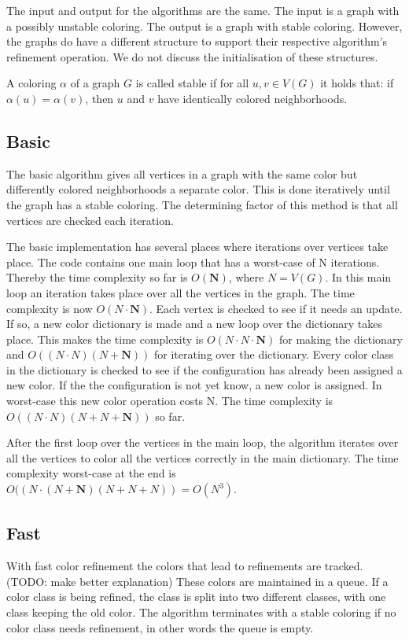 \documentclass[twoside]{article}
\begin{document}
\begin{multicols}{2}
The input and output for the algorithms are the same. The input is a graph with a possibly unstable  coloring. The output is a graph with stable coloring. However, the graphs do have a different structure to support their respective algorithm's refinement operation. We do not discuss the initialisation of these structures.

A coloring $\alpha$ of a graph $G$ is called stable if for all $u, v \in V(G)$ it holds that: if $\alpha(u) = \alpha(v)$, then $u$ and $v$ have identically colored neighborhoods.
 

\subsection{Basic}
The basic algorithm gives all vertices in a graph with the same color but differently colored neighborhoods a separate color. This is done iteratively until the graph has a stable coloring. The determining factor of this method is that all vertices are checked each iteration. 

The basic implementation has several places where iterations over vertices take place. The code contains one main loop that has a worst-case of N iterations. Thereby the time complexity so far is $O(\boldsymbol{N})$, where $N = V(G)$. In this main loop an iteration takes place over all the vertices in the graph. The time complexity is now $O(N \cdot \boldsymbol{N})$. Each vertex is checked to see if it needs an update. If so, a new color dictionary is made and a new loop over the dictionary takes place. This makes the time complexity is $O(N \cdot N \cdot \boldsymbol{N})$ for making the dictionary and $O((N \cdot N)(N+\boldsymbol{N}))$ for iterating over the dictionary. Every color class in the dictionary is checked to see if the configuration has already been assigned a new color. If the the configuration is not yet know, a new color is assigned. In worst-case this new color operation costs N. The time complexity is $O((N \cdot N)(N+N+\boldsymbol{N}))$ so far.

After the first loop over the vertices in the main loop, the algorithm iterates over all the vertices to color all the vertices correctly in the main dictionary. The time complexity worst-case at the end is $O((N \cdot (N+\boldsymbol{N})(N+N+N)) = O(N^3)$.


\subsection{Fast}
With fast color refinement the colors that lead to refinements are tracked.(TODO: make better explanation) These colors are maintained in a queue. If a color class is being refined, the class is split into two different classes, with one class keeping the old color. The algorithm terminates with a stable coloring if no color class needs refinement, in other words the queue is empty. 


\end{multicols}
\end{document}
